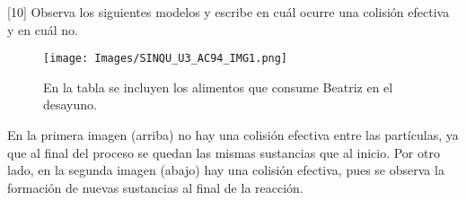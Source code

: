 [10] Observa los siguientes modelos y escribe en cuál ocurre una colisión efectiva y en cuál no.

\begin{figure}[H]
    \centering
    \texttt{[image: Images/SINQU\_U3\_AC94\_IMG1.png]}
    \caption{En la tabla se incluyen los alimentos que consume Beatriz en el desayuno.}
\end{figure}
\begin{solution}
    En la primera imagen (arriba) no hay una colisión efectiva entre las partículas, ya que al final del proceso se quedan las mismas sustancias que al inicio. Por otro lado, en la segunda imagen (abajo) hay una colisión efectiva, pues se observa la formación de nuevas sustancias al final de la reacción.
\end{solution}